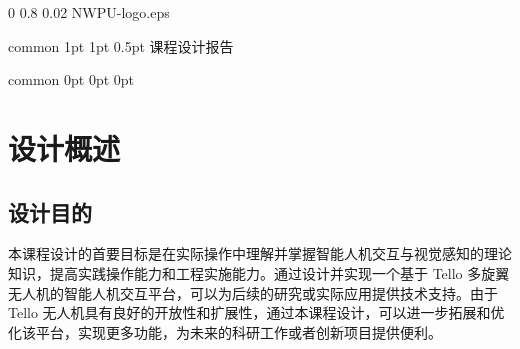 \documentclass[report, twoside, UTF8, AutoFakeBold = 1, AutoFakeSlant, zihao = -4]{config}
\begin{document}



\imageWatermark %
    {0} %
    {0.8} %
    {0.02} %
    {NWPU-logo.eps} %


\Header
    {common} %
    {1pt} %
    {1pt} %
    {0.5pt} %
    {课程设计报告} %
    {} %
    {\currentChapterInfo} %


\Footer
    {common} %
    {0pt} %
    {0pt} %
    {0pt} %
    {} %
    {\thepage} %
    {} %





\chapter{设计概述}

\section{设计目的}
本课程设计的首要目标是在实际操作中理解并掌握智能人机交互与视觉感知的理论知识，提高实践操作能力和工程实施能力。通过设计并实现一个基于 Tello 多旋翼无人机的智能人机交互平台，可以为后续的研究或实际应用提供技术支持。由于 Tello 无人机具有良好的开放性和扩展性，通过本课程设计，可以进一步拓展和优化该平台，实现更多功能，为未来的科研工作或者创新项目提供便利。
\end{document}
